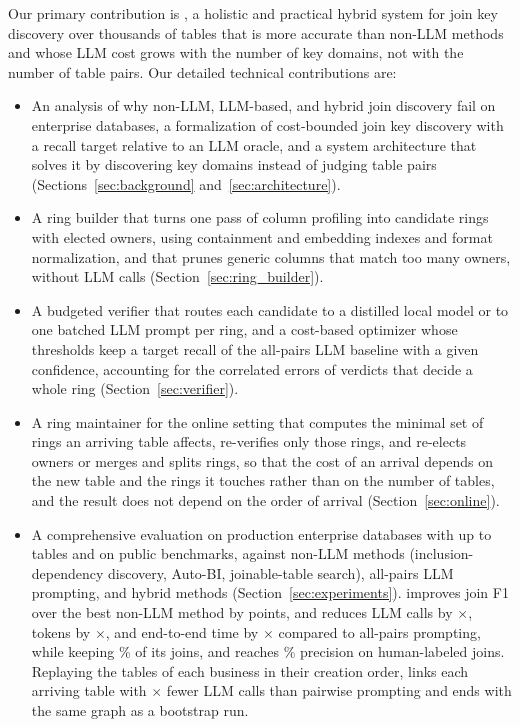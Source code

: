  Our primary contribution is \ourmethod, a holistic and practical hybrid system for join key discovery over thousands of tables that is more accurate than non-LLM methods and whose LLM cost grows with the number of key domains, not with the number of table pairs.
Our detailed technical contributions are:
\begin{itemize}[leftmargin=*]
\item An analysis of why non-LLM, LLM-based, and hybrid join discovery fail on enterprise databases, a formalization of cost-bounded join key discovery with a recall target relative to an LLM oracle, and a system architecture that solves it by discovering key domains instead of judging table pairs (Sections~\ref{sec:background} and~\ref{sec:architecture}).
\item A ring builder that turns one pass of column profiling into candidate rings with elected owners, using containment and embedding indexes and format normalization, and that prunes generic columns that match too many owners, without LLM calls (Section~\ref{sec:ring_builder}).
\item A budgeted verifier that routes each candidate to a distilled local model or to one batched LLM prompt per ring, and a cost-based optimizer whose thresholds keep a target recall of the all-pairs LLM baseline with a given confidence, accounting for the correlated errors of verdicts that decide a whole ring (Section~\ref{sec:verifier}).
\item A ring maintainer for the online setting that computes the minimal set of rings an arriving table affects, re-verifies only those rings, and re-elects owners or merges and splits rings, so that the cost of an arrival depends on the new table and the rings it touches rather than on the number of tables, and the result does not depend on the order of arrival (Section~\ref{sec:online}).
\item A comprehensive evaluation on  production enterprise databases with up to  tables and on public benchmarks, against non-LLM methods (inclusion-dependency discovery, Auto-BI, joinable-table search), all-pairs LLM prompting, and hybrid methods (Section~\ref{sec:experiments}). \ourmethod improves join F1 over the best non-LLM method by  points, and reduces LLM calls by $\times$, tokens by $\times$, and end-to-end time by $\times$ compared to all-pairs prompting, while keeping \% of its joins, and reaches \% precision on human-labeled joins.
Replaying the tables of each business in their creation order, \ourmethod links each arriving table with $\times$ fewer LLM calls than pairwise prompting and ends with the same graph as a bootstrap run.
\end{itemize}
